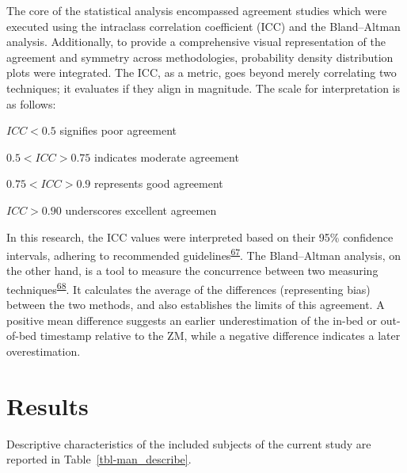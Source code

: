 \documentclass[
  9pt,
]{scrbook}
\begin{document}
The core of the statistical analysis encompassed agreement studies which
were executed using the intraclass correlation coefficient (ICC) and the
Bland--Altman analysis. Additionally, to provide a comprehensive visual
representation of the agreement and symmetry across methodologies,
probability density distribution plots were integrated. The ICC, as a
metric, goes beyond merely correlating two techniques; it evaluates if
they align in magnitude. The scale for interpretation is as follows:

\(ICC < 0.5\) signifies poor agreement

\(0.5 < ICC > 0.75\) indicates moderate agreement

\(0.75 < ICC > 0.9\) represents good agreement

\(ICC > 0.90\) underscores excellent agreemen

In this research, the ICC values were interpreted based on their 95\%
confidence intervals, adhering to recommended
guidelines\textsuperscript{\protect\hyperlink{ref-koo_guideline_2016}{67}}.
The Bland--Altman analysis, on the other hand, is a tool to measure the
concurrence between two measuring
techniques\textsuperscript{\protect\hyperlink{ref-bland_measuring_1999}{68}}.
It calculates the average of the differences (representing bias) between
the two methods, and also establishes the limits of this agreement. A
positive mean difference suggests an earlier underestimation of the
in-bed or out-of-bed timestamp relative to the ZM, while a negative
difference indicates a later overestimation.

\hypertarget{results}{%
\section{Results}\label{results}}

Descriptive characteristics of the included subjects of the current
study are reported in Table~\ref{tbl-man_describe}.

\begingroup

\footnotesize
\end{document}
